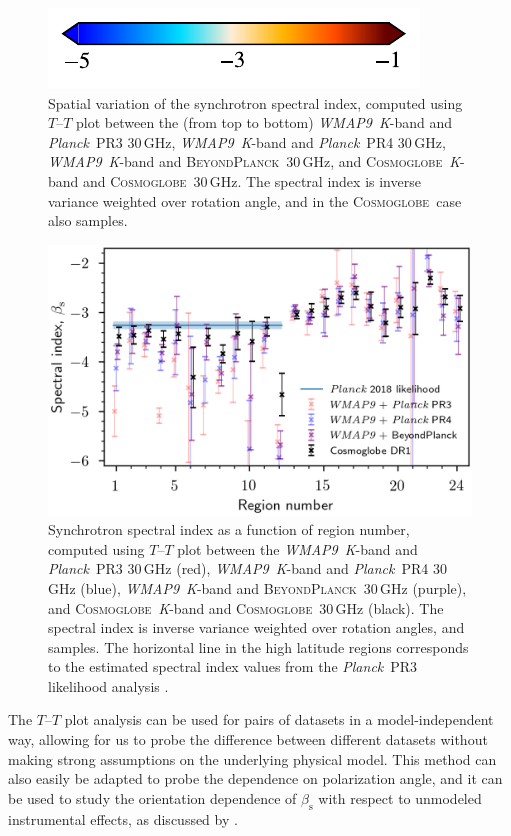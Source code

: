 \documentclass[twocolumn]{../../common/aa}
\def\WMAPnine{\emph{WMAP9}}
\def\Planck{\emph{Planck}}
\newcommand{\BP}{\textsc{BeyondPlanck}}
\newcommand{\Cosmoglobe}{\textsc{Cosmoglobe}}
\newcommand{\K}[0]{\textit K}
\begin{document}
\begin{figure}
	\hspace{0.25cm}\includegraphics{figures/cbar_beta_wide.pdf}
	\caption{Spatial variation of the synchrotron spectral index, computed using $T$--$T$ plot between the (from top to bottom) \WMAPnine\ \K-band and \Planck\ PR3 30\,GHz, \WMAPnine\ \K-band and \Planck\ PR4 30\,GHz, \WMAPnine\ \K-band and \BP\ 30\,GHz, and \Cosmoglobe\ \K-band and \Cosmoglobe\ 30\,GHz. The spectral index is inverse variance weighted over rotation angle, and in the \Cosmoglobe\ case also samples.}
        \label{fig:TT_beta_maps}
\end{figure}
\begin{figure}
        \centering
        \includegraphics[width=\linewidth]{figures/cos30_region_beta_cosmoglobe_vs_wmap_all.png}
        \caption{Synchrotron spectral index as a function of region number, computed using $T$--$T$ plot between the \WMAPnine\ \K-band and \Planck\ PR3 30\,GHz (red), \WMAPnine\ \K-band and \Planck\ PR4 30\,GHz (blue), \WMAPnine\ \K-band and \BP\ 30\,GHz (purple), and \Cosmoglobe\ \K-band and \Cosmoglobe\ 30\,GHz (black). The spectral index is inverse variance weighted over rotation angles, and samples. The horizontal line in the high latitude regions corresponds to the estimated spectral index values from the \Planck\ PR3 likelihood analysis \citep{planck2016-l05}. }
        \label{fig:cos30_beta_region}
\end{figure}

The $T$--$T$ plot analysis can be used for pairs of datasets in a model-independent way, allowing for us to probe the difference between different datasets without making strong assumptions on the underlying physical model. This method can also easily be adapted to probe the dependence on polarization angle, and it can be used to study the orientation dependence of $\beta_\mathrm s$ with respect to unmodeled instrumental effects, as discussed by \citet{wehus:2013}.
\end{document}
